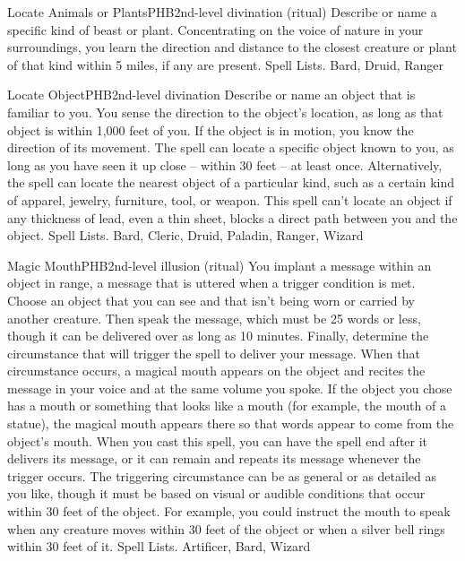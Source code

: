 \begin{spell}{Locate Animals or Plants}{PHB}{2nd-level divination (ritual)}
{
}
Describe or name a specific kind of beast or plant. Concentrating on the voice of nature in your surroundings, you learn the direction and distance to the closest creature or plant of that kind within 5 miles, if any are present.
Spell Lists. Bard, Druid, Ranger
\end{spell}

\begin{spell}{Locate Object}{PHB}{2nd-level divination}
{
}
Describe or name an object that is familiar to you. You sense the direction to the object’s location, as long as that object is within 1,000 feet of you. If the object is in motion, you know the direction of its movement.
The spell can locate a specific object known to you, as long as you have seen it up close – within 30 feet – at least once. Alternatively, the spell can locate the nearest object of a particular kind, such as a certain kind of apparel, jewelry, furniture, tool, or weapon.
This spell can’t locate an object if any thickness of lead, even a thin sheet, blocks a direct path between you and the object.
Spell Lists. Bard, Cleric, Druid, Paladin, Ranger, Wizard
\end{spell}

\begin{spell}{Magic Mouth}{PHB}{2nd-level illusion (ritual)}
{
}
You implant a message within an object in range, a message that is uttered when a trigger condition is met. Choose an object that you can see and that isn’t being worn or carried by another creature. Then speak the message, which must be 25 words or less, though it can be delivered over as long as 10 minutes. Finally, determine the circumstance that will trigger the spell to deliver your message.
When that circumstance occurs, a magical mouth appears on the object and recites the message in your voice and at the same volume you spoke. If the object you chose has a mouth or something that looks like a mouth (for example, the mouth of a statue), the magical mouth appears there so that words appear to come from the object’s mouth. When you cast this spell, you can have the spell end after it delivers its message, or it can remain and repeats its message whenever the trigger occurs.
The triggering circumstance can be as general or as detailed as you like, though it must be based on visual or audible conditions that occur within 30 feet of the object. For example, you could instruct the mouth to speak when any creature moves within 30 feet of the object or when a silver bell rings within 30 feet of it.
Spell Lists. Artificer, Bard, Wizard
\end{spell}

